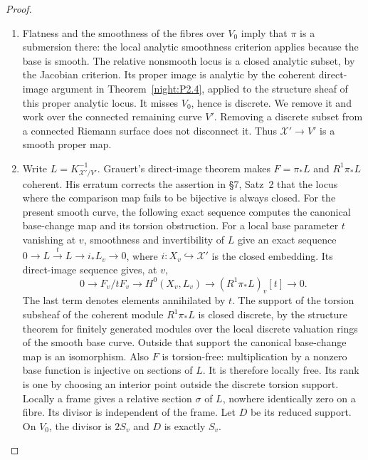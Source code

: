 \begin{proof}
\begin{enumerate}[label=\arabic*.,leftmargin=*]
\item Flatness and the smoothness of the fibres over \(V_0\) imply that
\(\pi\) is a submersion there: the local analytic smoothness criterion
applies because the base is smooth. The relative nonsmooth locus is a
closed analytic subset, by the Jacobian criterion. Its proper image is analytic by the coherent direct-image argument in Theorem~\ref{night:P2.4}, applied to the structure sheaf of this proper analytic locus.
It misses \(V_0\), hence is discrete. We remove it and work over the
connected remaining curve \(V'\). Removing a discrete subset from a
connected Riemann surface does not disconnect it. Thus
\(\mathcal X'\to V'\) is a smooth proper map.

\item Write \(L=K_{\mathcal X'/V'}^{-1}\). Grauert's direct-image theorem \cite[\S6, Hauptsatz~I, p.~59]{Grauert60} makes \(F=\pi_*L\) and \(R^1\pi_*L\) coherent. His erratum \cite[item~2, p.~36]{Grauert1963ErratumD} corrects the assertion in \S7, Satz~2 that the locus where the comparison map fails to be bijective is always closed. For the present smooth curve, the following exact sequence computes the canonical base-change map and its torsion obstruction.
For a local base parameter \(t\) vanishing at \(v\), smoothness and
invertibility of \(L\) give an exact sequence
\(0\to L\xrightarrow{t}L\to i_*L_v\to0\), where
\(i:X_v\hookrightarrow\mathcal X'\) is the closed embedding.
Its direct-image sequence gives, at \(v\),
\[
 0\longrightarrow F_v/tF_v\longrightarrow H^0(X_v,L_v)
 \longrightarrow (R^1\pi_*L)_v[t]\longrightarrow0.
\]
The last term denotes elements annihilated by \(t\). The support of
the torsion subsheaf of the coherent module \(R^1\pi_*L\) is closed
discrete, by the structure theorem for finitely generated modules
over the local discrete valuation rings of the smooth base curve.
Outside that support the canonical base-change map is an isomorphism.
Also \(F\) is torsion-free: multiplication by a nonzero base function
is injective on sections of \(L\). It is therefore locally free.
Its rank is one by choosing an interior point outside the discrete
torsion support.
Locally a frame gives a relative section \(\sigma\) of \(L\),
nowhere identically zero on a fibre. Its divisor is independent of the
frame. Let \(D\) be its reduced support. On \(V_0\), the divisor is
\(2S_v\) and \(D\) is exactly \(S_v\).


\end{enumerate}
\end{proof}
